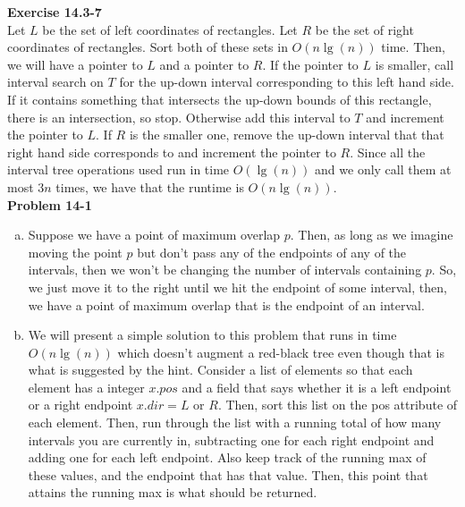 \documentclass{article}
\begin{document}
\noindent\textbf{ Exercise 14.3-7} \\
Let $L$ be the set of left coordinates of rectangles. Let $R$ be the set of right coordinates of rectangles. Sort both of these sets in $O(n\lg(n))$ time. Then, we will have a pointer to $L$ and a pointer to $R$. If the pointer to $L$ is smaller, call interval search on $T$ for the up-down interval corresponding to this left hand side. If it contains something that intersects the up-down bounds of this rectangle, there is an intersection, so stop. Otherwise add this interval to $T$ and increment the pointer to $L$. If $R$ is the smaller one, remove the up-down interval that that right hand side corresponds to and increment the pointer to $R$. Since all the interval tree operations used run in time $O(\lg(n))$ and we only call them at most $3n$ times, we have that the runtime is $O(n\lg(n))$.\\

\noindent\textbf{ Problem 14-1} \\
\begin{enumerate}[a.]
\item 
Suppose we have a point of maximum overlap $p$. Then, as long as we imagine moving the point $p$ but don't pass any of the endpoints of any of the intervals, then we won't be changing the number of intervals containing $p$. So, we just move it to the right until we hit the endpoint of some interval, then, we have a point of maximum overlap that is the endpoint of an interval.

\item
We will present a simple solution to this problem that runs in time $O(n\lg(n))$ which doesn't augment a red-black tree even though that is what is suggested by the hint. Consider a list of elements so that each element has a integer $x.pos$ and a field that says whether it is a left endpoint or a right endpoint $x.dir = L$ or $R$. Then, sort this list on the pos attribute of each element. Then, run through the list with a running total of how many intervals you are currently in, subtracting one for each right endpoint and adding one for each left endpoint. Also keep track of the running max of these values, and the endpoint that has that value. Then, this point that attains the running max is what should be returned.

\end{enumerate}
\end{document}
